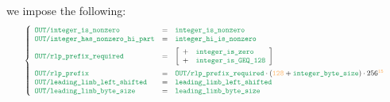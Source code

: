 \item[\underline{\underline{Justifying predictions:}}]
	    we impose the following:
	    \[
			\resizebox{.95\linewidth}{!}{$
	        \left\{ \begin{array}{lclr}
            \locOutputInputIntegerIsNonzero        & = & \locIntegerIsNonzero           \\
            \locOutputInputIntegerHasNonzeroHiPart & = & \locIntegerHiPartIsNonzero \vspace{2mm} \\
            \locOutputRlpPrefixRequired & = & \left[ \begin{array}{cl}
                + & \locIntegerIsZero               \\
                + & \locIntegerIsGeqOneTwoEight \\
            \end{array} \right] \vspace{2mm} \\
            \locOutputRlpPrefix              & = & \locOutputRlpPrefixRequired \cdot (\rlprefixShortInt + \locIntegerByteSize) \cdot 256^{\llargeMO} \\
            \locOutputLeadingLimbLeftShifted & = & \locLeadingLimbLeftShifted                                                                        \\
	            \locOutputLeadingLimbByteSize    & = & \locLeadingLimbByteSize                                                                           \\
	        \end{array} \right.
			$}
	    \]

